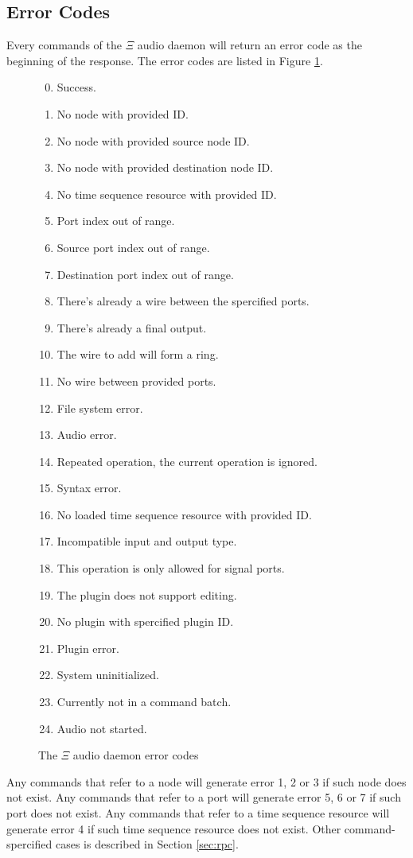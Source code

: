 \documentclass{report}
\newcommand{\Ksi}{$\Xi$ }
\begin{document}
\subsection{Error Codes}
Every commands of the \Ksi audio daemon will return an error code as the beginning of the response. The error codes are listed in Figure \ref{fig:errcode}.\par
\begin{figure}[htbp]
\begin{mdframed}[backgroundcolor=black!10]
\begin{enumerate}[label=\texttt{\arabic*}]
  \setcounter{enumi}{-1}
\item Success.
\item No node with provided ID.
\item No node with provided source node ID.
\item No node with provided destination node ID.
\item No time sequence resource with provided ID.
\item Port index out of range.
\item Source port index out of range.
\item Destination port index out of range.
\item There's already a wire between the spercified ports.
\item There's already a final output.
\item The wire to add will form a ring.
\item No wire between provided ports.
\item File system error.
\item Audio error.
\item Repeated operation, the current operation is ignored.
\item Syntax error.
\item No loaded time sequence resource with provided ID.
\item Incompatible input and output type.
\item This operation is only allowed for signal ports.
\item The plugin does not support editing.
\item No plugin with spercified plugin ID.
\item Plugin error.
\item System uninitialized.
\item Currently not in a command batch.
\item Audio not started.
\end{enumerate}
\end{mdframed}
\caption{The \Ksi audio daemon error codes}\label{fig:errcode}
\end{figure}
Any commands that refer to a node will generate error 1, 2 or 3 if such node does not exist. Any commands that refer to a port will generate error 5, 6 or 7 if such port does not exist. Any commands that refer to a time sequence resource will generate error 4 if such time sequence resource does not exist. Other command-spercified cases is described in Section \ref{sec:rpc}.
\end{document}
